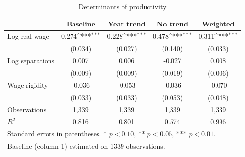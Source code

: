 \begin{table}[htbp]\centering
\def\sym#1{\ifmmode^{#1}\else\(^{#1}\)\fi}
\caption{Determinants of productivity\label{tab:prod}}
\begin{tabular}{l*{4}{c}}
\toprule
                    &\multicolumn{1}{c}{Baseline}&\multicolumn{1}{c}{Year trend}&\multicolumn{1}{c}{No trend}&\multicolumn{1}{c}{Weighted}\\
\midrule
Log real wage       &       0.274\sym{***}&       0.228\sym{***}&       0.478\sym{***}&       0.311\sym{***}\\
                    &     (0.034)         &     (0.027)         &     (0.140)         &     (0.033)         \\
Log separations     &       0.007         &       0.006         &      -0.027         &       0.008         \\
                    &     (0.009)         &     (0.009)         &     (0.019)         &     (0.006)         \\
Wage rigidity       &      -0.036         &      -0.053         &      -0.036         &      -0.070         \\
                    &     (0.033)         &     (0.033)         &     (0.053)         &     (0.048)         \\
\midrule
Observations        &       1,339         &       1,339         &       1,339         &       1,339         \\
$R^2$               &       0.816         &       0.801         &       0.574         &       0.996         \\
\bottomrule
\multicolumn{5}{l}{\footnotesize Standard errors in parentheses. * $p<0.10$, ** $p<0.05$, *** $p<0.01$.}\\
\multicolumn{5}{l}{\footnotesize Baseline (column 1) estimated on 1339 observations.}\\
\end{tabular}
\end{table}
